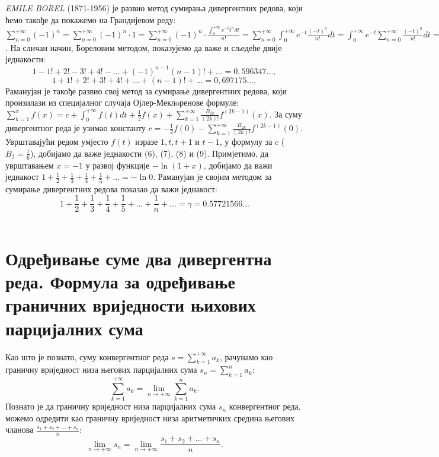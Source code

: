 \documentclass[12pt]{article}
\begin{document}
{\it EMILE BOREL} (1871-1956) је развио метод сумирања дивергентних редова, који ћемо такође да покажемо на Грандијевом реду: $\sum_{n=0}^{+\infty}(-1)^n=\sum_{n=0}^{+\infty}(-1)^n\cdot 1=\sum_{n=0}^{+\infty}(-1)^n\cdot \frac{\int_0^{+\infty} e^{-t}t^ndt}{n!}=\sum_{n=0}^{+\infty} \int_0^{+\infty} e^{-t}\frac{(-t)^n}{n!}dt=\int_0^{+\infty} e^{-t} \sum_{n=0}^{+\infty}\frac{(-t)^n}{n!}dt=\int_0^{+\infty} e^{-2t}dt=\frac{1}{2}$. На сличан начин, Бореловим методом, показујемо да важе и сљедеће двије једнакости: \begin{equation}
1-1!+2!-3!+4!-...+(-1)^{n-1}(n-1)!+...=0,596347...,
\end{equation} \begin{equation}
1+1!+2!+3!+4!+...+(n-1)!+...=0,697175...,
\end{equation}
Раманујан је такође развио свој метод за сумирање дивергентних редова, који произилази из специјалног случаја Ојлер-Меклoренове формуле: $\sum_{k=1}^x f(x)=c+\int_0^{+\infty} f(t)dt+\frac{1}{2}f(x)+\sum_{k=1}^{+\infty}\frac{B_{2k}}{(2k)!}f^{(2k-1)}(x)$. За суму дивергентног реда је узимао константу $c=-\frac{1}{2}f(0)-\sum_{k=1}^{+\infty}\frac{B_{2k}}{(2k)!}f^{(2k-1)}(0)$. Уврштавајући редом умјесто $f(t)$ изразе $1,t,t+1$ и $t-1$, у формулу за $c$ ($B_2=\frac{1}{6}$), добијамо да важе једнакости (6), (7), (8) и (9). Примјетимо, да уврштавањем $x=-1$ у развој функције $-\ln(1+x)$, добијамо да важи једнакост $1+\frac{1}{2}+\frac{1}{3}+\frac{1}{4}+\frac{1}{5}+...=-\ln0$. Раманујан је својим методом за сумирање дивергентних редова показао да важи једнакост: \begin{equation}
1+\frac{1}{2}+\frac{1}{3}+\frac{1}{4}+\frac{1}{5}+...+\frac{1}{n}+...=\gamma=0.57721566...
\end{equation}\\

\section{Одређивање суме два дивергентна реда. Формула за одређивање граничних вриједности њихових парцијалних сума}

Као што је познато, суму конвергентног реда $s=\sum_{k=1}^{+\infty}a_k$, рачунамо као граничну вриједност низа његових парцијалних сума $s_n=\sum_{k=1}^n a_k$: $$\sum_{k=1}^{+\infty}a_k=\lim_{n\to+\infty}\sum_{k=1}^n a_k.$$
Познато је да граничну вриједност низа парцијалних сума $s_n$ конвергентног реда, можемо одредити као граничну вриједност низа аритметичких средина његових чланова $\frac{s_1+s_2+...+s_n}{n}$: $$\lim_{n\to+\infty}s_n=\lim_{n\to+\infty}\frac{s_1+s_2+...+s_n}{n}.$$
\end{document}
